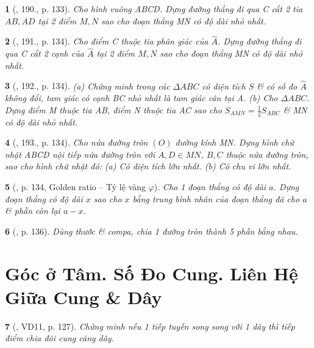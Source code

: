 \documentclass{article}
\newtheorem{baitoan}{}
\begin{document}
\begin{baitoan}[\cite{Binh_Toan_9_tap_1}, 190., p. 133]
	Cho hình vuông ABCD. Dựng đường thẳng đi qua C cắt 2 tia $AB,AD$ tại 2 điểm $M,N$ sao cho đoạn thẳng MN có độ dài nhỏ nhất.
\end{baitoan}

\begin{baitoan}[\cite{Binh_Toan_9_tap_1}, 191., p. 134]
	Cho điểm C thuộc tia phân giác của $\widehat{A}$. Dựng đường thẳng đi qua C cắt 2 cạnh của $\widehat{A}$ tại 2 điểm $M,N$ sao cho đoạn thẳng MN có độ dài nhỏ nhất.
\end{baitoan}

\begin{baitoan}[\cite{Binh_Toan_9_tap_1}, 192., p. 134]
	(a) Chứng minh trong các $\Delta ABC$ có diện tích $S$ \& có số đo $\widehat{A}$ không đổi, tam giác có cạnh BC nhỏ nhất là tam giác cân tại A. (b) Cho $\Delta ABC$. Dựng điểm M thuộc tia AB, điểm N thuộc tia AC sao cho $S_{AMN} = \frac{1}{2}S_{ABC}$  \& MN có độ dài nhỏ nhất.
\end{baitoan}

\begin{baitoan}[\cite{Binh_Toan_9_tap_1}, 193., p. 134]
	Cho nửa đường tròn $(O)$ đường kính MN. Dựng hình chữ nhật ABCD nội tiếp nửa đường tròn với $A,D\in MN$, $B,C$ thuộc nửa đường tròn, sao cho hình chữ nhật đó: (a) Có diện tích lớn nhất. (b) Có chu vi lớn nhất.
\end{baitoan}

\begin{baitoan}[\cite{Binh_Toan_9_tap_1}, p. 134, Golden ratio -- Tỷ lệ vàng $\varphi$]
	Cho 1 đoạn thẳng có độ dài $a$. Dựng đoạn thẳng có độ dài $x$ sao cho $x$ bằng trung bình nhân của đoạn thẳng đã cho $a$ \& phần còn lại $a - x$.
\end{baitoan}

\begin{baitoan}[\cite{Binh_Toan_9_tap_1}, p. 136]
	Dùng thước \& compa, chia 1 đường tròn thành 5 phần bằng nhau.
\end{baitoan}


\section{Góc ở Tâm. Số Đo Cung. Liên Hệ Giữa Cung \& Dây}

\begin{baitoan}[\cite{Tuyen_Toan_9_old}, VD11, p. 127]
	Chứng minh nếu 1 tiếp tuyến song song với 1 dây thì tiếp điểm chia đôi cung căng dây.
\end{baitoan}
\end{document}
